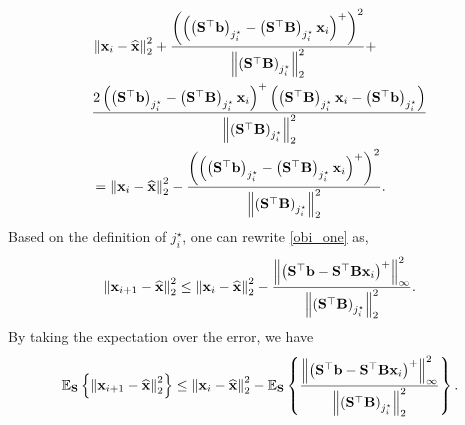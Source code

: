 \documentclass[12pt,draftcls,onecolumn]{IEEEtran}
\begin{document}
\begin{equation}
\label{obi_one}
\begin{aligned}
&\left\|\mbx_i-\widehat{\mbx}\right\|^2_2+\frac{\left(\left(\left(\mbS^{\top} \mbb\right)_{j^{\star}_{i}}-\left(\mbS^{\top}\mbB\right)_{j^{\star}_{i}}\mbx_{i}\right)^{+}\right)^2}{\left\|\left(\mbS^{\top}\mbB\right)_{j^{\star}_{i}}\right\|^2_2}+\\&\frac{2\left(\left(\mbS^{\top} \mbb\right)_{j^{\star}_{i}}-\left(\mbS^{\top}\mbB\right)_{j^{\star}_{i}}\mbx_{i}\right)^{+}\left(\left(\mbS^{\top}\mbB\right)_{j^{\star}_{i}}\mbx_{i}-\left(\mbS^{\top} \mbb\right)_{j^{\star}_{i}}\right)}{\left\|\left(\mbS^{\top}\mbB\right)_{j^{\star}_{i}}\right\|^2_2}
\\ &=\left\|\mbx_i-\widehat{\mbx}\right\|^2_2-\frac{\left(\left(\left(\mbS^{\top} \mbb\right)_{j^{\star}_{i}}-\left(\mbS^{\top}\mbB\right)_{j^{\star}_{i}}\mbx_{i}\right)^{+}\right)^2}{\left\|\left(\mbS^{\top}\mbB\right)_{j^{\star}_{i}}\right\|^2_2}.
\end{aligned}
\end{equation}
Based on the definition of $j_{i}^{\star}$, one can rewrite \eqref{obi_one} as,
\begin{equation}
\label{St_100}
\begin{aligned}
\left\|\mbx_{i+1}-\widehat{\mbx}\right\|_2^2\leq\left\|\mbx_i-\widehat{\mbx}\right\|_2^2-\frac{\left\|\left(\mbS^{\top} \mbb-\mbS^{\top}\mbB\mbx_i\right)^{+} \right\|_{\infty}^2}{\left\|\left(\mbS^{\top}\mbB\right)_{j^{\star}_{i}}\right\|_2^2}.
\end{aligned}
\end{equation}
By taking the expectation over the error, we have
\begin{equation}
\label{St_110}
\mathbb{E}_{\mbS}\left\{\left\|\mbx_{i+1}-\widehat{\mbx}\right\|_2^2\right\} \leq\left\|\mbx_i-\widehat{\mbx}\right\|_2^2-\mathbb{E}_{\mbS} \left\{\frac{\left\|\left(\mbS^{\top} \mbb-\mbS^{\top}\mbB\mbx_i\right)^{+} \right\|_{\infty}^2}{\left\|\left(\mbS^{\top}\mbB\right)_{j^{\star}_{i}}\right\|_2^2}\right\}.
\end{equation}\normalsize
\end{document}
